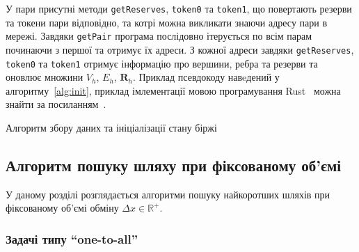 \documentclass[../index.tex]{subfiles}
\begin{document}
У пари присутні методи \texttt{getReserves}, \texttt{token0} та \texttt{token1},
що повертають резерви та токени пари відповідно, та котрі можна викликати знаючи
адресу пари в мережі. Завдяки \texttt{getPair} програма послідовно ітерується по
всім парам починаючи з першої та отримує їх адреси. З кожної адреси завдяки
\texttt{getReserves}, \texttt{token0} та \texttt{token1} отримує інформацію про
вершини, ребра та резерви та оновлює множини $V_{h}$, $E_{h}$, $\mathbf{R}_{h}$. Приклад
псевдокоду навeдений у алгоритму~\ref{alg:init}, приклад імлементації мовою
програмування Rust~\cite{matsakis2014rust} можна знайти за
посиланням~\cite{Baibula_Constant_Product_Market_2024}.

\begin{algorithm}
\caption{Алгоритм збору даних та ініціалізації стану біржі}\label{alg:init}
\begin{algorithmic}
 

     

     
     

     

\EndFor{}
\end{algorithmic}
\end{algorithm}

\subsection{Алгоритм пошуку шляху при фіксованому об'ємі}

У даному розділі розглядається алгоритми пошуку найкоротших шляхів при
фіксованому об'ємі обміну $\Delta x \in \mathbb{R}^{+}$.

\subsubsection{Задачі типу ``one-to-all''}
\end{document}

